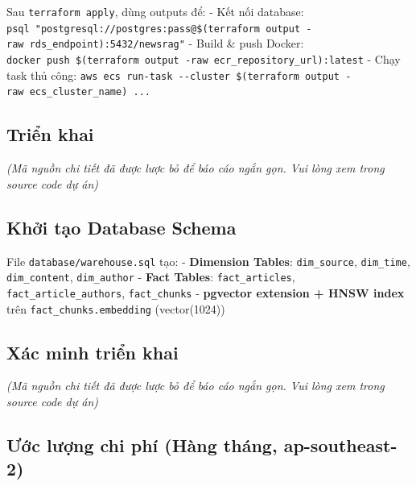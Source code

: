 Sau \texttt{terraform\ apply}, dùng outputs để: - Kết nối database:
\texttt{psql\ "postgresql://postgres:pass@\$(terraform\ output\ -raw\ rds\_endpoint):5432/newsrag"}
- Build \& push Docker:
\texttt{docker\ push\ \$(terraform\ output\ -raw\ ecr\_repository\_url):latest}
- Chạy task thủ công:
\texttt{aws\ ecs\ run-task\ -\/-cluster\ \$(terraform\ output\ -raw\ ecs\_cluster\_name)\ ...}

\hypertarget{triux1ec3n-khai}{%
\subsection{Triển khai}}

\emph{(Mã nguồn chi tiết đã được lược bỏ để báo cáo ngắn gọn. Vui lòng
xem trong source code dự án)}

\hypertarget{khux1edfi-tux1ea1o-database-schema}{%
\subsection{Khởi tạo Database
Schema}}

\begin{Shaded}
\begin{Highlighting}[]
\OperatorTok{=}\VariableTok{$(}\VariableTok{)}
  
\end{Highlighting}
\end{Shaded}

File \texttt{database/warehouse.sql} tạo: - \textbf{Dimension Tables}:
\texttt{dim\_source}, \texttt{dim\_time}, \texttt{dim\_content},
\texttt{dim\_author} - \textbf{Fact Tables}: \texttt{fact\_articles},
\texttt{fact\_article\_authors}, \texttt{fact\_chunks} -
\textbf{pgvector extension + HNSW index} trên
\texttt{fact\_chunks.embedding} (vector(1024))

\hypertarget{xuxe1c-minh-triux1ec3n-khai}{%
\subsection{Xác minh triển khai}}

\emph{(Mã nguồn chi tiết đã được lược bỏ để báo cáo ngắn gọn. Vui lòng
xem trong source code dự án)}

\hypertarget{ux1b0ux1edbc-lux1b0ux1ee3ng-chi-phuxed-huxe0ng-thuxe1ng-ap-southeast-2}{%
\subsection{Ước lượng chi phí (Hàng tháng,
ap-southeast-2)}}

